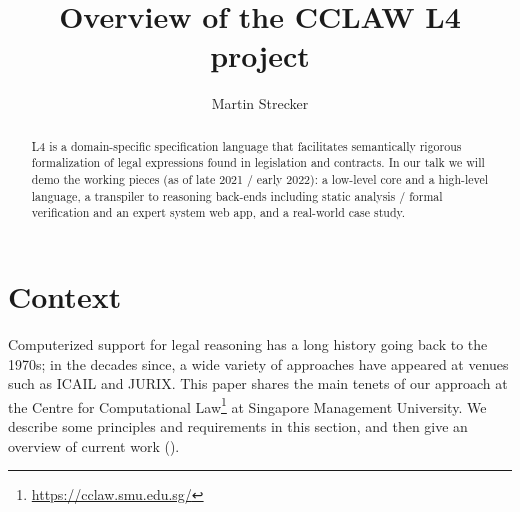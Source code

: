 \documentclass[runningheads]{llncs}
\begin{document}
\title{Overview of the CCLAW L4 project}

\author{Martin Strecker}
\maketitle

\begin{abstract}
L4 is a domain-specific specification language that facilitates semantically rigorous formalization of legal expressions found in legislation and contracts. In our talk we will demo the working pieces (as of late 2021 / early 2022): a low-level core and a high-level language, a transpiler to reasoning back-ends including static analysis / formal verification and an expert system web app, and a real-world case study.
\end{abstract}



\section{Context}\label{sec:context}

Computerized support for legal reasoning has a long history going back to the
1970s; in the decades since, a wide variety of approaches have appeared at venues such as ICAIL and JURIX.
This paper shares the main tenets of our approach at the Centre
for Computational Law\footnote{\url{https://cclaw.smu.edu.sg/}} at Singapore
Management University. We describe some principles and requirements in
this section, and then give an overview of current work
().
\end{document}

